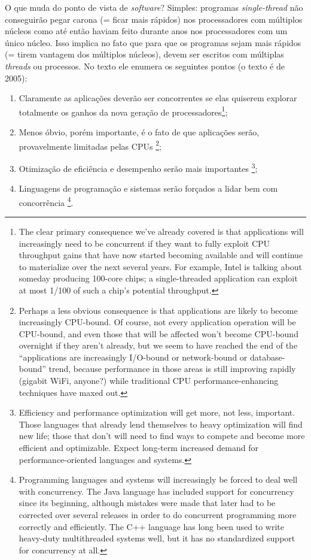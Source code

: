 \documentclass[]{article}
\begin{document}
		\par O que muda do ponto de vista de \textit{software}? Simples: programas \textit{single-thread} não 
		conseguirão pegar carona (= ficar mais rápidos) nos processadores com múltiplos núcleos como até então
		haviam feito durante anos nos processadores com um único núcleo. Isso implica no fato que para que os
		programas sejam mais rápidos (= tirem vantagem dos múltiplos núcleos), devem ser escritos com múltiplas
		\textit{threads} ou processos. No texto ele enumera os seguintes pontos (o texto é de 2005):
		\begin{enumerate}
			\item Claramente as aplicações deverão ser concorrentes se elas quiserem explorar
			totalmente os ganhos da nova geração de processadores\footnote{			
			 The clear primary consequence we’ve already covered is that applications will increasingly need to be
			 concurrent if they want to fully exploit CPU throughput gains that have now started becoming available and will
			 continue to materialize over the next several years. For example, Intel is talking about someday producing
			 100-core chips; a single-threaded application can exploit at most 1/100 of such a chip’s potential throughput.};

			\item Menos óbvio, porém importante, é o fato de que aplicações serão, provavelmente limitadas pelas CPUs
			\footnote{
			Perhaps a less obvious consequence is that applications are likely to become increasingly CPU-bound. Of
			 course, not every application operation will be CPU-bound, and even those that will be affected won’t become
			 CPU-bound overnight if they aren’t already, but we seem to have reached the end of the “applications are
			 increasingly I/O-bound or network-bound or database-bound” trend, because performance in those areas is still
			 improving rapidly (gigabit WiFi, anyone?) while traditional CPU performance-enhancing techniques have maxed
			 out.};
			
			\item Otimização de eficiência e desempenho serão mais importantes
			\footnote{
				Efficiency and performance optimization will get more, not less, important. Those languages that already
			 lend themselves to heavy optimization will find new life; those that don’t will need to find ways to compete and
			 become more efficient and optimizable. Expect long-term increased demand for performance-oriented languages and
			 systems.};
			
			\item Linguagens de programação e sistemas serão forçados a lidar bem com concorrência
			\footnote{
			Programming languages and systems will increasingly be forced to deal well with concurrency. The Java
			 language has included support for concurrency since its beginning, although mistakes were made that later had to
			 be corrected over several releases in order to do concurrent programming more correctly and efficiently. The C++
			 language has long been used to write heavy-duty multithreaded systems well, but it has no standardized support
			 for concurrency at all.}.
		\end{enumerate}
		
\end{document}
